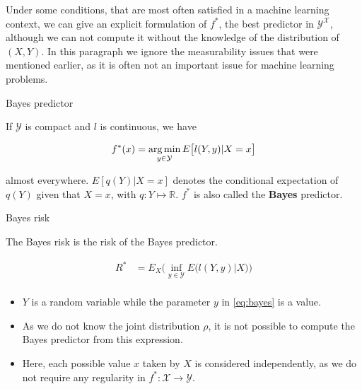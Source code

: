 \documentclass[
10pt, %
a4paper, %
oneside, %
headinclude,footinclude, %
BCOR5mm, %
]{scrartcl}
\begin{document}
    Under some conditions, that are most often satisfied in a machine learning
    context, we can give an explicit formulation of $f^*$, the best predictor
    in $ \mathcal{Y}^{ \mathcal{X} }$, although we can not compute it without
    the knowledge of the distribution of $(X,Y)$. In this paragraph we ignore
    the measurability issues that were mentioned earlier, as it is often not an
    important issue for machine learning problems.

    \begin{theorem}{Bayes predictor}
        
	If $ \mathcal{Y} $ is compact and $l$ is continuous, we have

	\begin{equation}
	    \label{eq:bayes}
	    f^*(x) = \operatorname*{arg\,min}_{y\in \mathcal{Y} }E\big[ l(Y, y)|X=x\big]
	\end{equation}

	almost everywhere. $E[q(Y)|X=x]$ denotes the conditional expectation of $q(Y)$ given that $X=x$, with $ q:Y\mapsto \mathbb{R} $. $f^*$ is also called the \textbf{{Bayes}} predictor.
    \end{theorem}

    \begin{definition}{Bayes risk}

	The Bayes risk is the risk of the Bayes predictor.

	\begin{equation}
        \begin{aligned}
            \label{eq:}
            R^* &= E_X\Big( \inf_{y\in \mathcal{Y} }E\big( l(Y, y)|X\big) \Big)\\
        \end{aligned}
	\end{equation}
    \end{definition}


    \begin{remark}
	\begin{itemize}
	    \item $Y$ is a random variable while the parameter $y$ in \ref{eq:bayes} is a value.
	    \item As we do not know the joint distribution $\rho$, it is not possible to compute the Bayes predictor from this expression.
	    \item Here, each possible value $x$  taken by $X$ is considered independently, as we do not require any regularity in $f^*: \mathcal{X}\rightarrow \mathcal{Y} $.
	\end{itemize}
    \end{remark}
\end{document}

